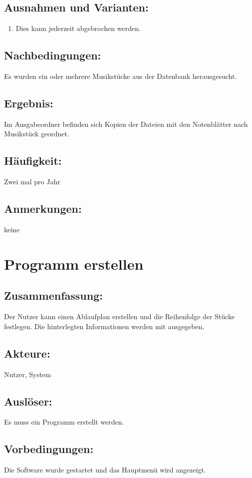 \documentclass[a4paper,10pt]{scrartcl}
\begin{document}
\subsection{Ausnahmen und Varianten:}
\begin{enumerate}
	\item Dies kann jederzeit abgebrochen werden.
\end{enumerate}
\subsection{Nachbedingungen:}
Es wurden ein oder mehrere Musikstücke aus der Datenbank herausgesucht.
\subsection{Ergebnis:}
Im Ausgabeordner befinden sich Kopien der Dateien mit den Notenblätter nach Musikstück geordnet.
\subsection{Häufigkeit:}
Zwei mal pro Jahr
\subsection{Anmerkungen:}
keine
\newpage

\section{Programm erstellen}
\label{uc programm erstellen}
\subsection{Zusammenfassung:}
Der Nutzer kann einen Ablaufplan erstellen und die Reihenfolge der Stücke festlegen. Die hinterlegten Informationen werden mit ausgegeben.
\subsection{Akteure:}
Nutzer, System
\subsection{Auslöser:}
Es muss ein Programm erstellt werden.
\subsection{Vorbedingungen:}
Die Software wurde gestartet und das Hauptmenü wird angezeigt.
\end{document}
